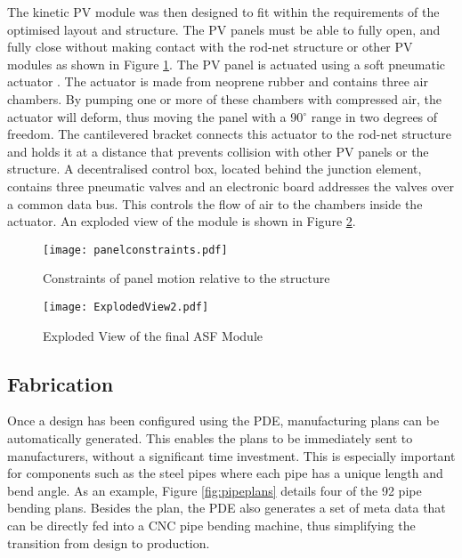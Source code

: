 The kinetic PV module was then designed to fit within the requirements of the optimised layout and structure. The PV panels must be able to fully open, and fully close without making contact with the rod-net structure or other PV modules as shown in Figure \ref{fig:constraints}. The PV panel is actuated using a soft pneumatic actuator \cite{Svetozarevic2017a}. The actuator is made from neoprene rubber and contains three air chambers. By pumping one or more of these chambers with compressed air, the actuator will deform, thus moving the panel with a 90$^{\circ}$ range in two degrees of freedom. The cantilevered bracket connects this actuator to the rod-net structure and holds it at a distance that prevents collision with other PV panels or the structure. A decentralised control box, located behind the junction element, contains three pneumatic valves and an electronic board addresses the valves over a common data bus. This controls the flow of air to the chambers inside the actuator. An exploded view of the module is shown in Figure \ref{fig:exploded}.


\begin{figure}
\begin{center}
\texttt{[image: panelconstraints.pdf]}
\caption{Constraints of panel motion relative to the structure}
\label{fig:constraints}
\end{center}
\end{figure}

\begin{figure}
\begin{center}
\texttt{[image: ExplodedView2.pdf]}
\caption{Exploded View of the final ASF Module}
\label{fig:exploded}
\end{center}
\end{figure}

\subsection{Fabrication}

Once a design has been configured using the PDE, manufacturing plans can be automatically generated. This enables the plans to be immediately sent to manufacturers, without a significant time investment. This is especially important for components such as the steel pipes where each pipe has a unique length and bend angle. As an example, Figure \ref{fig:pipeplans} details four of the 92 pipe bending plans. Besides the plan, the PDE also generates a set of meta data that can be directly fed into a CNC pipe bending machine, thus simplifying the transition from design to production.  

